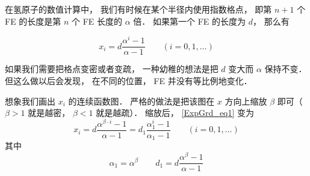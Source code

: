 

在氢原子的数值计算中， 我们有时候在某个半径内使用指数格点， 即第 $n+1$ 个 FE 的长度是第 $n$ 个 FE 长度的 $\alpha$ 倍． 如果第一个 FE 的长度为 $d$， 那么有

\begin{equation}\label{ExpGrd_eq1}
x_i = d \frac{\alpha^i - 1}{\alpha - 1}
\qquad (i = 0, 1, \dots)
\end{equation}

如果我们需要把格点变密或者变疏， 一种幼稚的想法是把 $d$ 变大而 $\alpha$ 保持不变． 但这么做以后会发现， 在不同的位置， FE 并没有等比例地变化．

想象我们画出 $x_i$ 的连续函数图． 严格的做法是把该图在 $x$ 方向上缩放 $\beta$ 即可（$\beta > 1$ 就是越密， $\beta < 1$ 就是越疏）． 缩放后， \autoref{ExpGrd_eq1} 变为
\begin{equation}
x_i = d \frac{\alpha^{\beta \cdot i} - 1}{\alpha - 1}
= d_1 \frac{\alpha_1^i - 1}{\alpha_1 - 1}
\qquad (i = 0, 1, \dots)
\end{equation}
其中
\begin{equation}
\alpha_1 = \alpha^\beta
\qquad
d_1 = d \frac{{\alpha^\beta - 1}}{\alpha - 1}
\end{equation}
